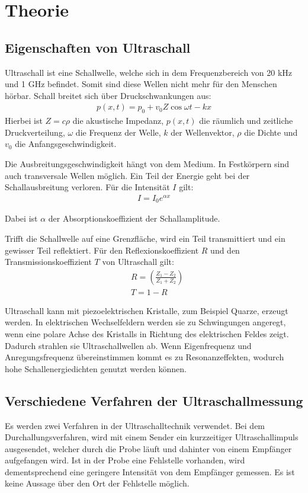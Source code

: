 \section{Theorie}
\label{sec:Theorie}

\subsection{Eigenschaften von Ultraschall}
Ultraschall ist eine Schallwelle, welche sich in dem Frequenzbereich von 20 kHz und 1 GHz befindet. Somit sind diese
Wellen nicht mehr für den Menschen hörbar. Schall breitet sich über Druckschwankungen aus:
\begin{align}
  p(x,t) = p_0 + v_0 Z \cos{\omega t - k x}
\end{align}
Hierbei ist $Z= c \rho$ die akustische Impedanz, $p(x, t)$ die räumlich und zeitliche Druckverteilung, $\omega$ die Frequenz der Welle,
$k$ der Wellenvektor, $\rho$ die Dichte und $v_0$ die Anfangsgeschwindigkeit.

Die Ausbreitungsgeschwindigkeit hängt von dem Medium. In Festkörpern sind auch transversale Wellen möglich. Ein Teil der
Energie geht bei der Schallausbreitung verloren. Für die Intensität $I$ gilt:
\begin{align}
  I =I_0 e^{\alpha x}
\end{align}

Dabei ist $\alpha$ der Absorptionskoeffizient der Schallamplitude.

Trifft die Schallwelle auf eine Grenzfläche, wird ein Teil transmittiert und ein gewisser Teil reflektiert.
Für den Reflexionskoeffizient $R$ und den Transmissionskoeffizient $T$ von Ultraschall gilt:
\begin{align}
  &R = \left( \frac{Z_1 - Z_2}{Z_1 + Z_2} \right) \\
  &T = 1 - R
\end{align}

Ultraschall kann mit piezoelektrischen Kristalle, zum Beispiel Quarze, erzeugt werden. In elektrischen Wechselfeldern werden
sie zu Schwingungen angeregt, wenn eine polare Achse des Kristalls in Richtung des elektrischen Feldes zeigt. Dadurch strahlen sie
Ultraschallwellen ab. Wenn Eigenfrequenz und Anregungsfrequenz übereinstimmen kommt es zu Resonanzeffekten, wodurch hohe Schallenergiedichten
genutzt werden können.


\subsection{Verschiedene Verfahren der Ultraschallmessung}
Es werden zwei Verfahren in der Ultraschalltechnik verwendet.
Bei dem Durchallungsverfahren, wird mit einem Sender ein kurzzeitiger Ultraschallimpuls ausgesendet, welcher
durch die Probe läuft und dahinter von einem Empfänger aufgefangen wird. Ist in der Probe eine Fehlstelle vorhanden, wird dementsprechend
eine geringere Intensität von dem Empfänger gemessen. Es ist keine Aussage über den Ort der Fehlstelle möglich.

